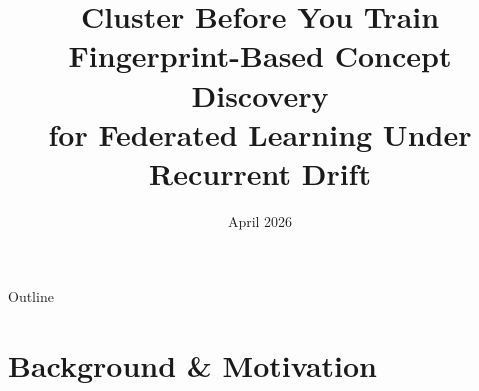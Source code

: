 \documentclass[aspectratio=169,11pt]{beamer}
\title[FedProTrack]{Cluster Before You Train\\[4pt]
  \normalsize Fingerprint-Based Concept Discovery\\
  for Federated Learning Under Recurrent Drift}
\author{}
\date{April 2026}
\institute{}
\begin{document}
\begin{frame}[plain]
\titlepage
\end{frame}

\begin{frame}{Outline}
\tableofcontents
\end{frame}

\section{Background \& Motivation}

\end{document}
